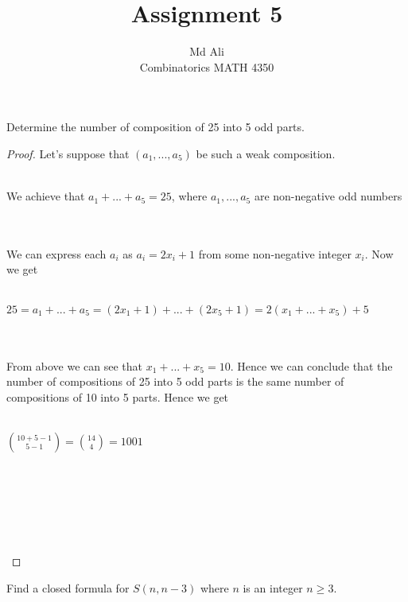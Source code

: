 \documentclass[12pt]{article}
\newenvironment{problem}[2][Problem]{\begin{trivlist}
\item[\hskip \labelsep {\bfseries #1}\hskip \labelsep {\bfseries #2.}]}{\end{trivlist}}
\begin{document}
 
 
\title{Assignment 5}%
\author{Md Ali\\ %
Combinatorics MATH 4350} %
 
\maketitle
 
\begin{problem}{1} %
Determine the number of composition of 25 into 5 odd parts.
\end{problem}
 
\begin{proof}
Let's suppose that $(a_1,...,a_5)$ be such a weak composition. \\ \\
\centerline{We achieve that $a_1+...+a_5=25$, where $a_1,...,a_5$ are non-negative odd numbers} \\ \\
We can express each $a_i$ as $a_i = 2x_i+1$ from some non-negative integer $x_i$. Now we get \\ \\
\centerline{$25 = a_1+...+a_5 = (2x_1+1)+...+(2x_5+1) = 2(x_1 +...+ x_5)+5$} \\ \\
From above we can see that $x_1+...+x_5 = 10$. Hence we can conclude that the number of compositions of 25 into 5 odd parts is the same number of compositions of 10 into 5 parts. Hence we get \\ \\
\centerline{$\displaystyle{10+5 - 1 \choose 5-1} = {14 \choose 4} = 1001$} \\ \\ \\
\centerline{} \\ \\
\end{proof}

\begin{problem}{2}
Find a closed formula for $S(n,n-3)$ where $n$ is an integer $n \geq 3$.
\end{problem}
\end{document}
